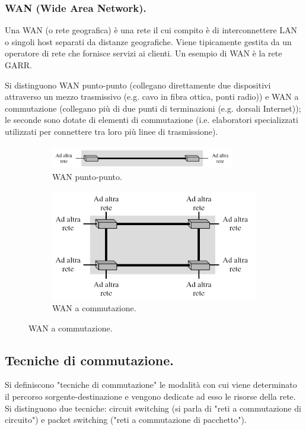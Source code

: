 \documentclass[11pt, italian, openany]{book}
\begin{document}
\begin{sloppypar}
\subsubsection*{WAN (Wide Area Network).}
Una WAN (o rete geografica) \`e una rete il cui compito \`e di interconnettere LAN o singoli host separati da distanze geografiche. Viene
tipicamente gestita da un operatore di rete che fornisce servizi ai clienti. Un esempio di WAN \`e la rete GARR.
\pagebreak

Si distinguono WAN punto-punto (collegano direttamente due dispositivi attraverso un mezzo trasmissivo (e.g. cavo in fibra ottica, ponti radio))
e WAN a commutazione (collegano pi\`u di due punti di terminazioni (e.g. dorsali Internet)); le seconde sono dotate di elementi di commutazione
(i.e. elaboratori specializzati utilizzati per connettere tra loro pi\`u linee di trasmissione).

\begin{figure}[h!]
	\begin{subfigure}{0.49 \linewidth} \centering
		\includegraphics[width=80mm,height=10mm]{images/wan-puntopunto.png}
		\caption{WAN punto-punto.}
	\end{subfigure}
	\begin{subfigure}{0.49 \linewidth} \centering
		\includegraphics[scale=0.35]{images/wan-commutazione.png}
		\caption{WAN a commutazione.}
	\end{subfigure}
\end{figure}

\subsection{Tecniche di commutazione.}
Si definiscono "tecniche di commutazione" le modalit\`a con cui viene determinato il percorso sorgente-destinazione e vengono dedicate ad esso le
risorse della rete. Si distinguono due tecniche: circuit switching (si parla di "reti a commutazione di circuito") e packet switching ("reti a
commutazione di pacchetto").


\end{sloppypar}
\end{document}
